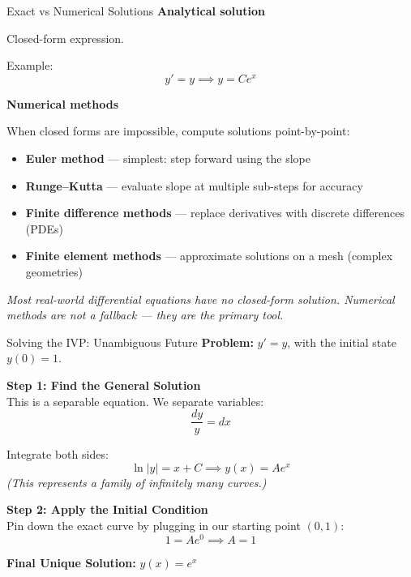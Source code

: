 
\begin{frame}{Exact vs Numerical Solutions}
\textbf{Analytical solution}

Closed-form expression.

Example:
\[
y' = y \implies y = Ce^x
\]

\textbf{Numerical methods}

When closed forms are impossible, compute solutions point-by-point:
\begin{itemize}
\item \textbf{Euler method} --- simplest: step forward using the slope
\item \textbf{Runge--Kutta} --- evaluate slope at multiple sub-steps for accuracy
\item \textbf{Finite difference methods} --- replace derivatives with discrete differences (PDEs)
\item \textbf{Finite element methods} --- approximate solutions on a mesh (complex geometries)
\end{itemize}

\vspace{0.3cm}
\textit{Most real-world differential equations have no closed-form solution. Numerical methods are not a fallback --- they are the primary tool.}
\end{frame}


\begin{frame}{Solving the IVP: Unambiguous Future}
\textbf{Problem:} $y' = y$, with the initial state $y(0) = 1$.

\textbf{Step 1: Find the General Solution} \\
This is a separable equation. We separate variables:
$$\frac{dy}{y} = dx$$

Integrate both sides:
$$\ln|y| = x + C \implies y(x) = Ae^x$$
\textit{(This represents a family of infinitely many curves.)}

\textbf{Step 2: Apply the Initial Condition} \\
Pin down the exact curve by plugging in our starting point $(0, 1)$:
$$1 = Ae^0 \implies A = 1$$

\textbf{Final Unique Solution:}
$y(x) = e^x$
\end{frame}

